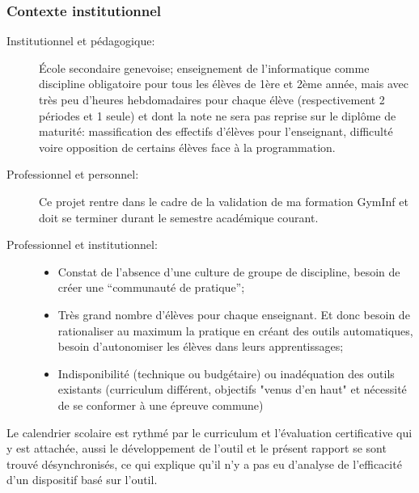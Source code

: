 \documentclass[11pt,a4paper]{article}
\begin{document}
\subsubsection{Contexte institutionnel}
\begin{description}
    \item[Institutionnel et pédagogique:] École secondaire genevoise; enseignement de l'informatique comme discipline obligatoire pour tous les élèves de 1ère et 2ème année, mais avec très peu d’heures hebdomadaires pour chaque élève (respectivement 2 périodes et 1 seule) et dont la note ne sera pas reprise sur le diplôme de maturité: massification des effectifs d’élèves pour l’enseignant, difficulté voire opposition de certains élèves face à la programmation.
    \item[Professionnel et personnel:] Ce projet rentre dans le cadre de la validation de ma formation GymInf et doit se terminer durant le semestre académique courant.
    \item[Professionnel et institutionnel:]
    
        \begin{itemize}
        \item Constat de l'absence d’une culture de groupe de discipline, besoin de créer une “communauté de pratique”; 
        \item Très grand nombre d'élèves pour chaque enseignant. Et donc besoin de rationaliser au maximum la pratique en créant des outils automatiques, besoin d’autonomiser les élèves dans leurs apprentissages; 
        \item Indisponibilité (technique ou budgétaire) ou inadéquation des outils existants (curriculum différent, objectifs "venus d'en haut" et nécessité de se conformer à une épreuve commune)
        \end{itemize}
\end{description}
Le calendrier scolaire est rythmé par le curriculum et l'évaluation certificative qui y est attachée, aussi le développement de l'outil et le présent rapport se sont trouvé désynchronisés, ce qui explique qu'il n'y a pas eu d'analyse de l'efficacité d'un dispositif basé sur l'outil.
    
\end{document}
